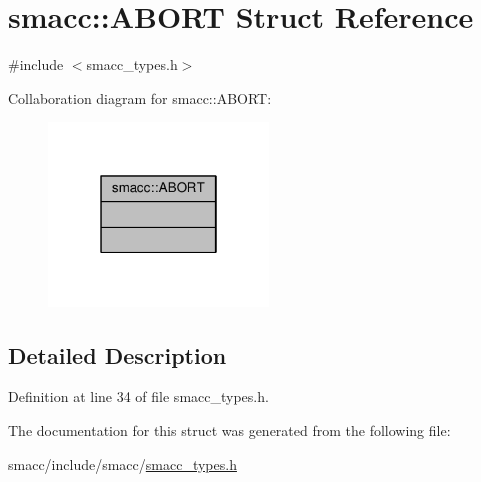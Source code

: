 \hypertarget{structsmacc_1_1ABORT}{}\section{smacc\+:\+:A\+B\+O\+RT Struct Reference}
\label{structsmacc_1_1ABORT}


{\ttfamily \#include $<$smacc\+\_\+types.\+h$>$}



Collaboration diagram for smacc\+:\+:A\+B\+O\+RT\+:
\nopagebreak
\begin{figure}[H]
\begin{center}
\leavevmode
\includegraphics[width=166pt]{structsmacc_1_1ABORT__coll__graph}
\end{center}
\end{figure}


\subsection{Detailed Description}


Definition at line 34 of file smacc\+\_\+types.\+h.



The documentation for this struct was generated from the following file\+:\begin{DoxyCompactItemize}
\item 
smacc/include/smacc/\hyperlink{smacc__types_8h}{smacc\+\_\+types.\+h}\end{DoxyCompactItemize}
